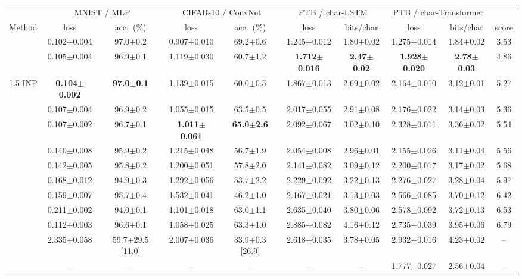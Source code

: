\begin{tabular}{l cc cc cc cc c}
\toprule
 & \multicolumn{2}{c}{MNIST / MLP} & \multicolumn{2}{c}{CIFAR-10 / ConvNet} & \multicolumn{2}{c}{PTB / char-LSTM} & \multicolumn{2}{c}{PTB / char-Transformer} & \\
\cmidrule(lr){2-3}\cmidrule(lr){4-5}\cmidrule(lr){6-7}\cmidrule(lr){8-9}
Method & loss & acc.\ (\%) & loss & acc.\ (\%) & loss & bits/char & loss & bits/char & score \\
\midrule
\BP{} & 0.102$\pm$0.004 & 97.0$\pm$0.2 & 0.907$\pm$0.010 & 69.2$\pm$0.6 & 1.245$\pm$0.012 & 1.80$\pm$0.02 & 1.275$\pm$0.014 & 1.84$\pm$0.02 & 3.53 \\
\DUST{} & 0.105$\pm$0.004 & 96.9$\pm$0.1 & 1.119$\pm$0.030 & 60.7$\pm$1.2 & \textbf{1.712$\pm$0.016} & \textbf{2.47$\pm$0.02} & \textbf{1.928$\pm$0.020} & \textbf{2.78$\pm$0.03} & 4.86 \\
1.5-INP & \textbf{0.104$\pm$0.002} & \textbf{97.0$\pm$0.1} & 1.139$\pm$0.015 & 60.0$\pm$0.5 & 1.867$\pm$0.013 & 2.69$\pm$0.02 & 2.164$\pm$0.010 & 3.12$\pm$0.01 & 5.27 \\
\INP{} & 0.107$\pm$0.004 & 96.9$\pm$0.2 & 1.055$\pm$0.015 & 63.5$\pm$0.5 & 2.017$\pm$0.055 & 2.91$\pm$0.08 & 2.176$\pm$0.022 & 3.14$\pm$0.03 & 5.36 \\
\NP{} & 0.107$\pm$0.002 & 96.7$\pm$0.1 & \textbf{1.011$\pm$0.061} & \textbf{65.0$\pm$2.6} & 2.092$\pm$0.067 & 3.02$\pm$0.10 & 2.328$\pm$0.011 & 3.36$\pm$0.02 & 5.54 \\
\SPSAb{} & 0.140$\pm$0.008 & 95.9$\pm$0.2 & 1.215$\pm$0.048 & 56.7$\pm$1.9 & 2.054$\pm$0.008 & 2.96$\pm$0.01 & 2.155$\pm$0.026 & 3.11$\pm$0.04 & 5.56 \\
\SPSA{} & 0.142$\pm$0.005 & 95.8$\pm$0.2 & 1.200$\pm$0.051 & 57.8$\pm$2.0 & 2.141$\pm$0.082 & 3.09$\pm$0.12 & 2.200$\pm$0.017 & 3.17$\pm$0.02 & 5.68 \\
\RS{} & 0.168$\pm$0.012 & 94.9$\pm$0.3 & 1.292$\pm$0.056 & 53.7$\pm$2.2 & 2.229$\pm$0.092 & 3.22$\pm$0.13 & 2.276$\pm$0.027 & 3.28$\pm$0.04 & 5.97 \\
\ANPb{} & 0.159$\pm$0.007 & 95.7$\pm$0.4 & 1.532$\pm$0.041 & 46.2$\pm$1.0 & 2.167$\pm$0.021 & 3.13$\pm$0.03 & 2.566$\pm$0.085 & 3.70$\pm$0.12 & 6.42 \\
\DANP{} & 0.211$\pm$0.002 & 94.0$\pm$0.1 & 1.101$\pm$0.018 & 63.0$\pm$1.1 & 2.635$\pm$0.040 & 3.80$\pm$0.06 & 2.578$\pm$0.092 & 3.72$\pm$0.13 & 6.53 \\
\ANP{} & 0.112$\pm$0.003 & 96.6$\pm$0.1 & 1.058$\pm$0.025 & 63.3$\pm$1.0 & 2.885$\pm$0.082 & 4.16$\pm$0.12 & 2.735$\pm$0.039 & 3.95$\pm$0.06 & 6.79 \\
\FF{} & 2.335$\pm$0.058 & 59.7$\pm$29.5 [11.0] & 2.007$\pm$0.036 & 33.9$\pm$0.3 [26.9] & 2.618$\pm$0.035 & 3.78$\pm$0.05 & 2.932$\pm$0.016 & 4.23$\pm$0.02 & -- \\
\IPC{} & -- & -- & -- & -- & -- & -- & 1.777$\pm$0.027 & 2.56$\pm$0.04 & -- \\
\bottomrule
\end{tabular}
